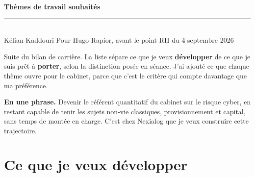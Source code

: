 \documentclass[11pt,a4paper]{article}
\begin{document}
\small

{\Large\bfseries\color{bleu} Thèmes de travail souhaités}\\[3pt]
{\color{accent}\rule{\textwidth}{1.1pt}}\\[3pt]
{\footnotesize Kélian Kaddouri \hfill Pour Hugo Rapior, avant le point RH du 4 septembre
2026}

\vspace{5pt}

\noindent Suite du bilan de carrière. La liste sépare ce que je veux \textbf{développer} de
ce que je suis prêt à \textbf{porter}, selon la distinction posée en séance. J'ai ajouté ce
que chaque thème ouvre pour le cabinet, parce que c'est le critère qui compte davantage que
ma préférence.

\vspace{3pt}
\noindent\textbf{En une phrase.} Devenir le référent quantitatif du cabinet sur le risque
cyber, en restant capable de tenir les sujets non-vie classiques, provisionnement et
capital, sans temps de montée en charge. C'est chez Nexialog que je veux construire cette
trajectoire.

\section{Ce que je veux développer}
\end{document}
